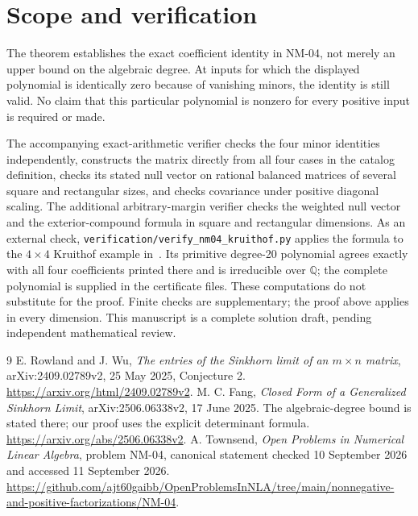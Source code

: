 \documentclass[11pt]{article}
\begin{document}
\section{Scope and verification}
The theorem establishes the exact coefficient identity in NM-04, not merely an upper bound on the algebraic degree. At inputs for which the displayed polynomial is identically zero because of vanishing minors, the identity is still valid. No claim that this particular polynomial is nonzero for every positive input is required or made.

The accompanying exact-arithmetic verifier checks the four minor identities independently, constructs the matrix directly from all four cases in the catalog definition, checks its stated null vector on rational balanced matrices of several square and rectangular sizes, and checks covariance under positive diagonal scaling. The additional arbitrary-margin verifier checks the weighted null vector and the exterior-compound formula in square and rectangular dimensions. As an external check, \texttt{verification/verify\_nm04\_kruithof.py} applies the formula to the $4\times4$ Kruithof example in~\cite[Example 32]{rw}. Its primitive degree-20 polynomial agrees exactly with all four coefficients printed there and is irreducible over $\mathbb Q$; the complete polynomial is supplied in the certificate files. These computations do not substitute for the proof. Finite checks are supplementary; the proof above applies in every dimension. This manuscript is a complete solution draft, pending independent mathematical review.

\begin{thebibliography}{9}
 E. Rowland and J. Wu, \emph{The entries of the Sinkhorn limit of an $m\times n$ matrix}, arXiv:2409.02789v2, 25 May 2025, Conjecture 2.
\url{https://arxiv.org/html/2409.02789v2}.
 M. C. Fang, \emph{Closed Form of a Generalized Sinkhorn Limit}, arXiv:2506.06338v2, 17 June 2025. The algebraic-degree bound is stated there; our proof uses the explicit determinant formula.
\url{https://arxiv.org/abs/2506.06338v2}.
 A. Townsend, \emph{Open Problems in Numerical Linear Algebra}, problem NM-04, canonical statement checked 10 September 2026 and accessed 11 September 2026.
\url{https://github.com/ajt60gaibb/OpenProblemsInNLA/tree/main/nonnegative-and-positive-factorizations/NM-04}.
\end{thebibliography}
\end{document}
